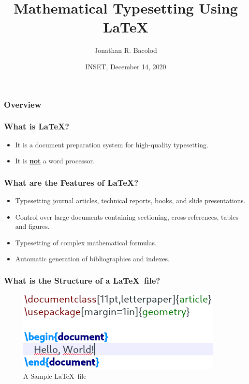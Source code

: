 \documentclass[17pt]{beamer}
\title[Math Typesetting Using \LaTeX] {Mathematical Typesetting Using \LaTeX}
\author{Jonathan R. Bacolod}
\institute[SHS]{Sauyo High School}
\date[INSET, Dec. 2020]{INSET, December 14, 2020}
\begin{document}
	\frame{\titlepage}

	\begin{frame}
		\frametitle{Overview}
		\tableofcontents 
	\end{frame}

    \begin{frame}
    	\frametitle{What is \LaTeX?}
    	\begin{itemize}
    		\item It is a document preparation system for high-quality typesetting.
    		\item \pause It is \textbf{\underline{not}} a word processor.
    	\end{itemize}
    \end{frame}	

	\begin{frame}
		\frametitle{What are the Features of \LaTeX?}
		\footnotesize
		\begin{itemize}
			\item Typesetting journal articles, technical reports, books, and slide presentations.
			\item \pause Control over large documents containing sectioning, cross-references, tables and figures.
			\item \pause Typesetting of complex mathematical formulas.
			\item \pause Automatic generation of bibliographies and indexes.
		\end{itemize}
	\end{frame}	
	
	\begin{frame}
		\frametitle{What is the Structure of a \LaTeX\ file?}
		
		\begin{figure}
			\centering
			\includegraphics[width=0.7\linewidth]{pics/sample-doc}
			\caption{A Sample \LaTeX\ file}
			\label{fig:sample-doc}
		\end{figure}
	
	\end{frame}	
\end{document}
